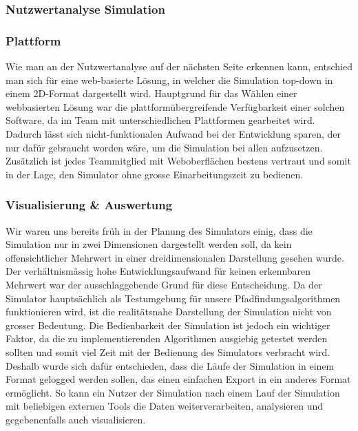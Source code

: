 \documentclass[main.tex]{subfiles} %
\begin{document}

\subsubsection{Nutzwertanalyse Simulation}

\subsubsection*{Plattform}
Wie man an der Nutzwertanalyse auf der nächsten Seite erkennen kann, entschied
man sich für eine web-basierte Lösung, in welcher die Simulation top-down in
einem 2D-Format dargestellt wird. Hauptgrund für das Wählen einer webbasierten
Lösung war die plattformübergreifende Verfügbarkeit einer solchen Software, da
im Team mit unterschiedlichen Plattformen gearbeitet wird. Dadurch lässt sich
nicht-funktionalen Aufwand bei der Entwicklung sparen, der nur dafür gebraucht
worden wäre, um die Simulation bei allen aufzusetzen. Zusätzlich ist jedes
Teammitglied mit Weboberflächen bestens vertraut und somit in der Lage, den
Simulator ohne grosse Einarbeitungszeit zu bedienen.

\subsubsection*{Visualisierung \& Auswertung}
Wir waren uns bereits früh in der Planung des Simulators einig, dass die
Simulation nur in zwei Dimensionen dargestellt werden soll, da kein
offensichtlicher Mehrwert in einer dreidimensionalen Darstellung gesehen wurde.
Der verhältnismässig hohe Entwicklungsaufwand für keinen erkennbaren Mehrwert
war der ausschlaggebende Grund für diese Entscheidung. Da der Simulator
hauptsächlich als Testumgebung für unsere Pfadfindungsalgorithmen funktionieren
wird, ist die realitätsnahe Darstellung der Simulation nicht von grosser
Bedeutung. Die Bedienbarkeit der Simulation ist jedoch ein wichtiger Faktor, da
die zu implementierenden Algorithmen ausgiebig getestet werden sollten und
somit viel Zeit mit der Bedienung des Simulators verbracht wird. Deshalb wurde
sich dafür entschieden, dass die Läufe der Simulation in einem Format gelogged
werden sollen, das einen einfachen Export in ein anderes Format ermöglicht. So
kann ein Nutzer der Simulation nach einem Lauf der Simulation mit beliebigen
externen Tools die Daten weiterverarbeiten, analysieren und gegebenenfalls auch
visualisieren.
\end{document}

